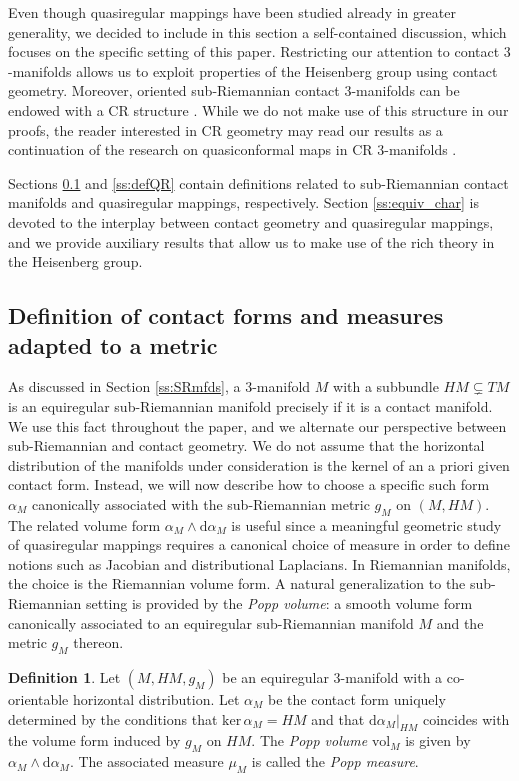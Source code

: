 \documentclass[10pt,letterpaper]{amsart}
\theoremstyle{definition}
\newtheorem{definition}[thm]{Definition}
\numberwithin{thm}{subsection}
\numberwithin{equation}{section}
\begin{document}
Even though quasiregular mappings have been studied already in
greater generality, we decided to include in this section a
self-contained discussion, which focuses on the specific setting
of this paper.
Restricting our attention to contact $3$-manifolds allows us to
exploit properties of the Heisenberg group using contact geometry.
Moreover, oriented sub-Riemannian
contact $3$-manifolds can be endowed with a CR structure
\cite{FGV}. While we do not make use of this structure in our
proofs, the reader  interested in CR geometry may read our
results as a continuation of the research on quasiconformal maps
in CR $3$-manifolds
\cite{MR1055843,MR1404088,MR1340848,MR1246889}.

Sections \ref{ss:contactSR} and \ref{ss:defQR} contain definitions
related to sub-Riemannian contact manifolds and quasiregular
mappings, respectively. Section \ref{ss:equiv_char} is devoted to
the interplay between contact geometry and quasiregular mappings,
and we provide auxiliary results that allow us to make use of the
rich theory in the Heisenberg group.

\subsection{Definition of contact forms and measures adapted to a metric}\label{ss:contactSR}
 As discussed in Section \ref{ss:SRmfds}, a $3$-manifold $M$ with a subbundle $HM \subsetneq TM$ is an
 equiregular sub-Riemannian manifold precisely if it is a contact manifold.
 We use this fact throughout the paper, and we alternate our perspective between sub-Riemannian and contact geometry.
We do not assume that the horizontal distribution of the manifolds under consideration is the kernel of an a priori given contact form.
 Instead, we will now describe how to choose a specific such form $\alpha_M$ canonically associated with the sub-Riemannian metric $g_M$ on $(M,HM)$. The related volume form $\alpha_M\wedge \mathrm{d}\alpha_M$ is useful since a meaningful geometric study of quasiregular mappings requires a canonical choice of measure in order to define notions such as Jacobian and distributional Laplacians. In Riemannian manifolds, the choice is the Riemannian volume form. A natural generalization to the sub-Riemannian setting is provided by the
\emph{Popp volume}: a smooth volume form canonically associated to an equiregular sub-Riemannian manifold $M$ and the metric $g_M$ thereon.

\begin{definition}\label{d:Popp} Let $(M,HM,g_M)$ be an equiregular $3$-manifold with a co-orientable horizontal distribution.
Let $\alpha_M$ be the contact form uniquely determined by the conditions that $\mathrm{ker}\,\alpha_M = HM$ and that
$\mathrm{d}{\alpha_M}|_{HM}$ coincides with the volume form induced by $g_M$ on $HM$.
The \emph{Popp volume} $\mathrm{vol}_M$ is given by $\alpha_M\wedge \mathrm{d}\alpha_M$. The associated measure $\mu_M$ is called the \emph{Popp measure}.
 \end{definition}
\end{document}
